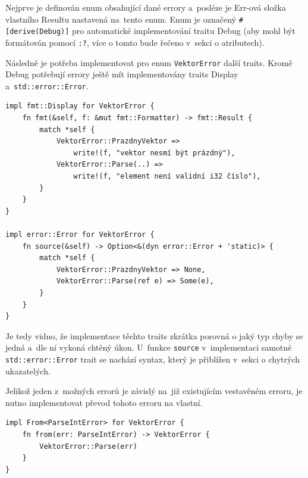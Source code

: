 \documentclass[a4paper, 12pt]{article} %
\newcommand{\rust}[1]{\texttt{#1}}
\begin{document}
            Nejprve je definován enum obsahující dané errory a~posléze je Err-ová složka vlastního Resultu nastavená na~tento enum. Enum je označený \rust{#[derive(Debug)]} pro automatické implementování traitu Debug (aby mohl být formátován pomocí \rust{:?}, více o tomto bude řečeno v~sekci o atributech).
            
            Následně je potřeba implementovat pro enum \rust{VektorError} další traits. Kromě Debug potřebují errory ještě mít implementovány traits Display a~\rust{std::error::Error}.
            \begin{verbatim}
impl fmt::Display for VektorError {
    fn fmt(&self, f: &mut fmt::Formatter) -> fmt::Result {
        match *self {
            VektorError::PrazdnyVektor =>
                write!(f, "vektor nesmí být prázdný"),
            VektorError::Parse(..) =>
                write!(f, "element není validní i32 číslo"),
        }
    }
}

impl error::Error for VektorError {
    fn source(&self) -> Option<&(dyn error::Error + 'static)> {
        match *self {
            VektorError::PrazdnyVektor => None,
            VektorError::Parse(ref e) => Some(e),
        }
    }
}
            \end{verbatim}

            Je tedy vidno, že implementace těchto traits zkrátka porovná o jaký typ chyby se jedná a~dle ní vykoná chtěný úkon. U~funkce \rust{source} v~implementaci  samotné \rust{std::error::Error} trait se nachází syntax, který je přiblížen v~sekci o chytrých ukazatelých.
            
            Jelikož jeden z~možných errorů je závislý na~již existujícím vestavěném erroru, je nutno implementovat převod tohoto erroru na vlastní.
            \begin{verbatim}
impl From<ParseIntError> for VektorError {
    fn from(err: ParseIntError) -> VektorError {
        VektorError::Parse(err)
    }
}
            \end{verbatim}
            
\end{document}
